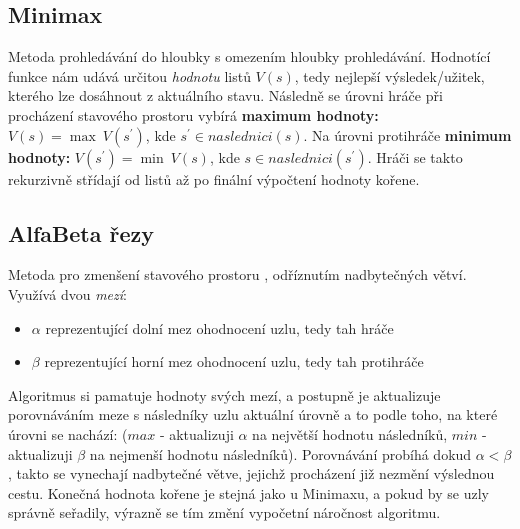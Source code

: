 \subsection{Minimax}
Metoda \cite{AI1} prohledávání do hloubky s omezením hloubky prohledávání. Hodnotící funkce nám udává určitou \textit{hodnotu} listů $V(s)$, tedy nejlepší výsledek/užitek, kterého lze dosáhnout z aktuálního stavu.
Následně se úrovni hráče při procházení stavového prostoru vybírá \textbf{maximum hodnoty:} $V(s) = \max \: V(s^\prime)$, kde $s^\prime \in naslednici(s)$. 
\newline
Na úrovni protihráče \textbf{minimum hodnoty:} $V(s^\prime) = \min \: V(s)$, kde $s \in naslednici(s^\prime)$. Hráči se takto rekurzivně střídají od listů až po finální výpočtení hodnoty kořene.

\subsection{AlfaBeta řezy}
Metoda pro zmenšení stavového prostoru \cite{AI1}, odříznutím nadbytečných větví. Využívá dvou \textit{mezí}:
\begin{itemize}
\item \boldmath$\alpha$ reprezentující dolní mez ohodnocení uzlu, tedy tah hráče
\item \boldmath$\beta$ reprezentující horní mez ohodnocení uzlu, tedy tah protihráče
\end{itemize}
Algoritmus si pamatuje hodnoty svých mezí, a postupně je aktualizuje porovnáváním meze s následníky uzlu aktuální úrovně a to podle toho, na které úrovni se nachází: ($max$ - aktualizuji $\alpha$ na největší hodnotu následníků, $min$ - aktualizuji $\beta$ na nejmenší hodnotu následníků). Porovnávání probíhá dokud $\alpha < \beta$, takto se vynechají nadbytečné větve, jejichž procházení již nezmění výslednou cestu. Konečná hodnota kořene je stejná jako u Minimaxu, a pokud by se uzly správně seřadily, výrazně se tím změní vypočetní náročnost algoritmu. 
